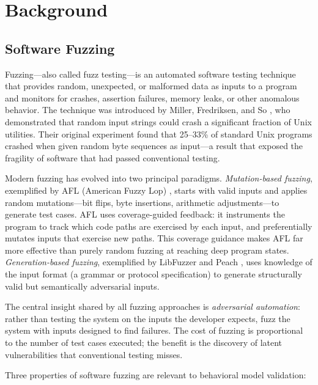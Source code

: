 \documentclass[12pt]{article}
\begin{document}
\section{Background}
\label{sec:background}

\subsection{Software Fuzzing}

Fuzzing---also called fuzz testing---is an automated software testing technique that provides random, unexpected, or malformed data as inputs to a program and monitors for crashes, assertion failures, memory leaks, or other anomalous behavior.  The technique was introduced by Miller, Fredriksen, and So \cite{miller1990}, who demonstrated that random input strings could crash a significant fraction of Unix utilities.  Their original experiment found that 25--33\% of standard Unix programs crashed when given random byte sequences as input---a result that exposed the fragility of software that had passed conventional testing.

Modern fuzzing has evolved into two principal paradigms.  \emph{Mutation-based fuzzing}, exemplified by AFL (American Fuzzy Lop) \cite{zalewski2014}, starts with valid inputs and applies random mutations---bit flips, byte insertions, arithmetic adjustments---to generate test cases.  AFL uses coverage-guided feedback: it instruments the program to track which code paths are exercised by each input, and preferentially mutates inputs that exercise new paths.  This coverage guidance makes AFL far more effective than purely random fuzzing at reaching deep program states.  \emph{Generation-based fuzzing}, exemplified by LibFuzzer \cite{serebryany2016} and Peach \cite{eddington2009}, uses knowledge of the input format (a grammar or protocol specification) to generate structurally valid but semantically adversarial inputs.

The central insight shared by all fuzzing approaches is \emph{adversarial automation}: rather than testing the system on the inputs the developer expects, fuzz the system with inputs designed to find failures.  The cost of fuzzing is proportional to the number of test cases executed; the benefit is the discovery of latent vulnerabilities that conventional testing misses.

Three properties of software fuzzing are relevant to behavioral model validation:
\end{document}
